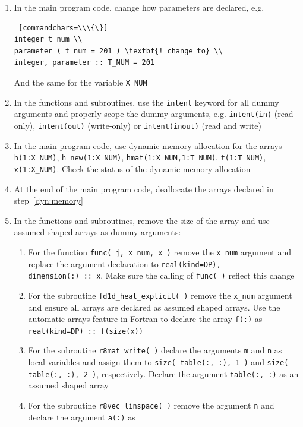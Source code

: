\documentclass[12pt]{article}
\begin{document}
\begin{enumerate}
\begin{Verbatim} [commandchars=\\\{\}]
  fd1d_heat_explicit.f90 -o \textit{fd1d_heat_explicit.f90_pol}
mv \textit{fd1d_heat_explicit.f90_pol} fd1d_heat_explicit.f90
\end{Verbatim}
\item In the main program code, change how parameters are declared, e.g.
\begin{Verbatim} [commandchars=\\\{\}]
integer t_num \\
parameter ( t_num = 201 ) \textbf{! change to} \\
integer, parameter :: T_NUM = 201
\end{Verbatim}
And the same for the variable \texttt{X\_NUM}
\item In the functions and subroutines, use the \texttt{intent} keyword for all dummy arguments and properly
  scope the dummy arguments, e.g. \texttt{intent(in)} (read-only), \texttt{intent(out)} (write-only) or
  \texttt{intent(inout)} (read and write)
\item In the main program code, use dynamic memory allocation for the arrays \texttt{h(1:X\_NUM)}, 
\texttt{h\_new(1:X\_NUM)}, \texttt{hmat(1:X\_NUM,1:T\_NUM)}, \texttt{t(1:T\_NUM)}, \texttt{x(1:X\_NUM)}. Check
the status of the dynamic memory allocation\label{dyn:memory}
\item At the end of the main program code, deallocate the arrays declared in step~\ref{dyn:memory}
\item In the functions and subroutines, remove the size of the array and use assumed shaped
arrays as dummy arguments:
\begin{enumerate}
\item For the function \texttt{func( j, x\_num, x )} remove the \texttt{x\_num} argument and
replace the argument declaration to \texttt{real(kind=DP), dimension(:)\ ::\ x}. Make sure
the calling of \texttt{func( )} reflect this change
\item For the subroutine \texttt{fd1d\_heat\_explicit( )} remove the \texttt{x\_num} argument
and ensure all arrays are declared as assumed shaped arrays. Use the automatic arrays feature in Fortran
to declare the array \texttt{f(:)} as \texttt{real(kind=DP) ::\ f(size(x))}
\item For the subroutine \texttt{r8mat\_write( )} declare the arguments \texttt{m} and \texttt{n} as local variables
  and assign them
to \texttt{size( table(:, :), 1 )} and \texttt{size( table(:, :), 2 )}, respectively. Declare the argument \texttt{table(:, :)}
as an assumed shaped array
\item For the subroutine \texttt{r8vec\_linspace( )} remove the argument \texttt{n} and declare the argument \texttt{a(:)} as

\end{enumerate}
\end{enumerate}
\end{document}
